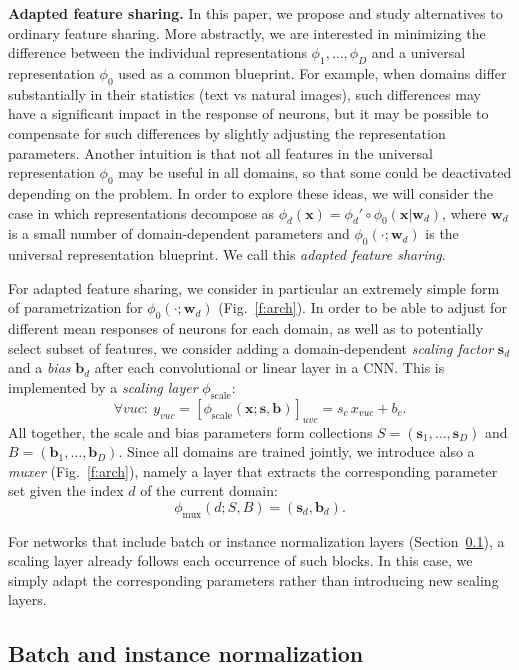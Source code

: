 \documentclass[10pt,twocolumn,letterpaper]{article}
\newcommand{\bx}{\mathbf{x}}
\newcommand{\bw}{\mathbf{w}}
\renewcommand{\paragraph}[1]{\par\medskip\noindent\textbf{#1}}
\begin{document}
\paragraph{Adapted feature sharing.} In this paper, we propose and study alternatives to ordinary feature sharing. More abstractly, we are interested in minimizing the difference between the individual representations $\phi_1,\dots,\phi_D$ and a universal representation $\phi_0$ used as a common blueprint. For example, when domains differ substantially in their statistics (\eg text vs natural images), such differences may have a significant impact in the response of neurons, but it may be possible to compensate for such differences by slightly adjusting the representation parameters. Another intuition is that not all features in the universal representation $\phi_0$ may be useful in all domains, so that some could be deactivated depending on the problem. In order to explore these ideas, we will consider the case in which representations decompose as $\phi_d(\bx) = \phi_d' \circ \phi_0(\bx|\bw_d)$, where $\bw_d$ is a small number of domain-dependent parameters and $\phi_0(\cdot;\bw_d)$ is the universal representation blueprint. We call this \emph{adapted feature sharing}.

For adapted feature sharing, we consider in particular an extremely simple form of parametrization for $\phi_0(\cdot;\bw_d)$ (Fig.~\ref{f:arch}). In order to be able to adjust for different mean responses of neurons for each domain, as well as to potentially select subset of features, we consider adding a domain-dependent \emph{scaling factor}  $\bm s_d$ and a \emph{bias} $\bm b_d$ after each convolutional or linear layer in a CNN. This is implemented by a \emph{scaling layer} $\phi_\text{scale}$:
\[
\forall vuc:\ y_{vuc} = [\phi_\text{scale}(\bx;\bm s,\bm b)]_{uvc}
=
s_c\,x_{vuc} + b_c.
\]
All together, the scale and bias parameters form collections $S=(\bm s_1,\dots,\bm s_D)$ and $B=(\bm b_1,\dots,\bm b_D)$. Since all domains are trained jointly, we introduce also a \emph{muxer} (Fig.~\ref{f:arch}), namely a layer that extracts the corresponding parameter set given the index $d$ of the current domain:
\[
  \phi_\text{mux}(d;S,B) = (\bm s_d,\bm b_d).
\]

For networks that include batch or instance normalization layers (Section~\ref{s:norm}), a scaling layer already follows each occurrence of such blocks. In this case, we simply adapt the corresponding parameters rather than introducing new scaling layers.

\subsection{Batch and instance normalization}\label{s:norm}
\end{document}
